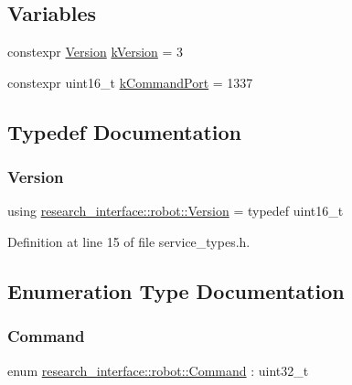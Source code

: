 \subsection*{Variables}
\begin{DoxyCompactItemize}
\item 
constexpr \hyperlink{namespaceresearch__interface_1_1robot_aa7a53d2c58ee4f7aa706b905ddcc7d47}{Version} \hyperlink{namespaceresearch__interface_1_1robot_ab5e6cd0268270dc6e0adea0eb333b5df}{k\+Version} = 3
\item 
constexpr uint16\+\_\+t \hyperlink{namespaceresearch__interface_1_1robot_a7485024e26d10cbc7ad99a2f76091274}{k\+Command\+Port} = 1337
\end{DoxyCompactItemize}


\subsection{Typedef Documentation}
\mbox{\label{namespaceresearch__interface_1_1robot_aa7a53d2c58ee4f7aa706b905ddcc7d47}} 
\subsubsection{\texorpdfstring{Version}{Version}}
{\footnotesize\ttfamily using \hyperlink{namespaceresearch__interface_1_1robot_aa7a53d2c58ee4f7aa706b905ddcc7d47}{research\+\_\+interface\+::robot\+::\+Version} = typedef uint16\+\_\+t}



Definition at line 15 of file service\+\_\+types.\+h.



\subsection{Enumeration Type Documentation}
\mbox{\label{namespaceresearch__interface_1_1robot_a72624b344f0614e623ef21a53fb0aa50}} 
\subsubsection{\texorpdfstring{Command}{Command}}
{\footnotesize\ttfamily enum \hyperlink{namespaceresearch__interface_1_1robot_a72624b344f0614e623ef21a53fb0aa50}{research\+\_\+interface\+::robot\+::\+Command} \+: uint32\+\_\+t\hspace{0.3cm}{\ttfamily [strong]}}

